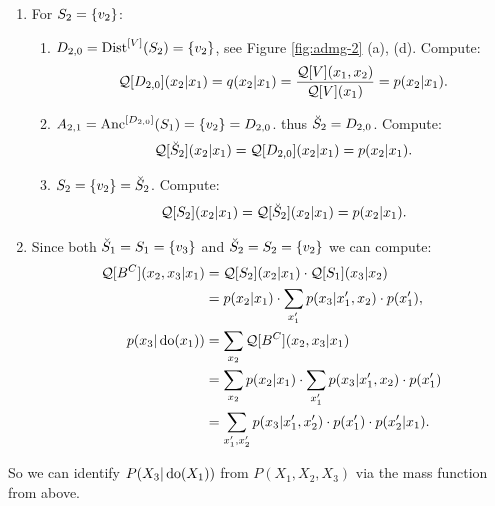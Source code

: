 \begin{Eg}
\begin{enumerate}
\begin{enumerate}
                \item $ S_1 = \lC v_3 \rC = \idc S_1$. Compute:
                    \begin{align*}
                       \Qf[S_1](x_3|x_2) =    \Qf[\idc S_1](x_3|x_2) = \sum_{x_1} p(x_3|x_1,x_2) \cdot p(x_1).
                    \end{align*}
            \end{enumerate}
       \item For $S_2=\left \{ v_2 \right \}$:
            \begin{enumerate}
                \item $D_{2,0} = \mathrm{Dist}^{[V]}(S_2) = \left \{ v_2 \right \}$, see Figure \ref{fig:admg-2} (a), (d). Compute:
                    \begin{align*}
                \mathcal{Q}[D_{2,0}](x_2|x_1) =  q(x_2|x_1)  = \frac{\mathcal{Q}[V](x_1,x_2)}{\mathcal{Q}[V](x_1)}  = p(x_2|x_1).
                    \end{align*}
                \item $A_{2,1} = \mathrm{Anc}^{[D_{2,0}]}(S_1) = \left \{ v_2  \right \} = D_{2,0}$. thus $\breve{S}_2 = D_{2,0}$. Compute:
                 \begin{align*}
               \mathcal{Q}[\breve{S}_2](x_2|x_1)  = \mathcal{Q}[D_{2,0}](x_2|x_1)  = p(x_2|x_1).
                    \end{align*}
                \item $S_2 = \left \{ v_2 \right \} =\breve{S}_2$. Compute:
                 \begin{align*}
               \mathcal{Q}[S_2](x_2|x_1)  = \mathcal{Q}[\breve{S}_2](x_2|x_1)  = p(x_2|x_1).
                    \end{align*}
            \end{enumerate}
        \item Since both $\breve{S}_1 = S_1 = \left \{ v_3 \right \}$ and $\breve{S}_2 =S_2 = \left \{ v_2\right \}$ we can compute:
               \begin{align*}
                   \mathcal{Q}[B^C](x_2,x_3|x_1) &= \mathcal{Q}[S_2](x_2|x_1) \cdot \mathcal{Q}[S_1](x_3|x_2) \\ 
                                         &= p(x_2|x_1) \cdot \sum_{x_1'} p(x_3|x_1',x_2) \cdot p(x_1'), \\
                   p(x_3|\operatorname{do}(x_1)) & = \sum_{x_2} \mathcal{Q}[B^C](x_2,x_3|x_1) \\ 
                   & = \sum_{x_2} p(x_2|x_1) \cdot \sum_{x_1'} p(x_3|x_1',x_2) \cdot p(x_1') \\
                   & = \sum_{x_1',x_2'} p(x_3|x_1',x_2') \cdot p(x_1') \cdot p(x_2'|x_1).   
               \end{align*}
    \end{enumerate}
    So we can identify $P(X_3|\operatorname{do}(X_1))$ from $P(X_1,X_2,X_3)$ via the mass function from above.
\end{Eg}









